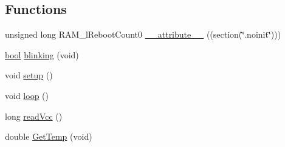 \subsection*{Functions}
\begin{DoxyCompactItemize}
\item 
unsigned long R\-A\-M\-\_\-l\-Reboot\-Count0 \hyperlink{OWH__DS2433__EEPROM__LCD__Sensors_8ino_a96573b623ef42a0a72e78b7cc249169a}{\-\_\-\-\_\-attribute\-\_\-\-\_\-} ((section(\char`\"{}.noinit\char`\"{})))
\item 
\hyperlink{stdbool_8h_abb452686968e48b67397da5f97445f5b}{bool} \hyperlink{OWH__DS2433__EEPROM__LCD__Sensors_8ino_a6766eee584b84ead350781efbabe36d7}{blinking} (void)
\item 
void \hyperlink{OWH__DS2433__EEPROM__LCD__Sensors_8ino_a4fc01d736fe50cf5b977f755b675f11d}{setup} ()
\item 
void \hyperlink{OWH__DS2433__EEPROM__LCD__Sensors_8ino_afe461d27b9c48d5921c00d521181f12f}{loop} ()
\item 
long \hyperlink{OWH__DS2433__EEPROM__LCD__Sensors_8ino_a8e23c9421f6663303ea22e4969e2f6c1}{read\-Vcc} ()
\item 
double \hyperlink{OWH__DS2433__EEPROM__LCD__Sensors_8ino_a0a60fd2316c16170dc7aa6aa0f5f485d}{Get\-Temp} (void)
\end{DoxyCompactItemize}
